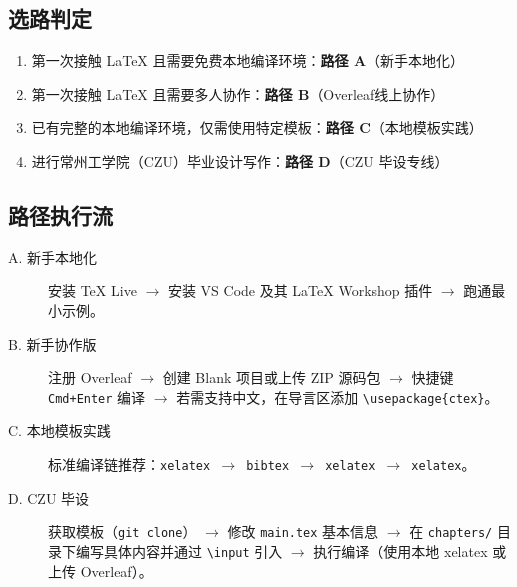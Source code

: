 \subsection{选路判定}
\begin{enumerate}
    \item 第一次接触 LaTeX 且需要免费本地编译环境：\textbf{路径 A}（新手本地化）
    \item 第一次接触 LaTeX 且需要多人协作：\textbf{路径 B}（Overleaf线上协作）
    \item 已有完整的本地编译环境，仅需使用特定模板：\textbf{路径 C}（本地模板实践）
    \item 进行常州工学院（CZU）毕业设计写作：\textbf{路径 D}（CZU 毕设专线）
\end{enumerate}

\subsection{路径执行流}
\begin{description}
    \item[A. 新手本地化] 安装 TeX Live $\rightarrow$ 安装 VS Code 及其 LaTeX Workshop 插件 $\rightarrow$ 跑通最小示例。
    \item[B. 新手协作版] 注册 Overleaf $\rightarrow$ 创建 Blank 项目或上传 ZIP 源码包 $\rightarrow$ 快捷键 \texttt{Cmd+Enter} 编译 $\rightarrow$ 若需支持中文，在导言区添加 \texttt{\textbackslash usepackage\{ctex\}}。
    \item[C. 本地模板实践] 标准编译链推荐：\texttt{xelatex $\rightarrow$ bibtex $\rightarrow$ xelatex $\rightarrow$ xelatex}。
    \item[D. CZU 毕设] 获取模板（\texttt{git clone}） $\rightarrow$ 修改 \texttt{main.tex} 基本信息 $\rightarrow$ 在 \texttt{chapters/} 目录下编写具体内容并通过 \texttt{\textbackslash input} 引入 $\rightarrow$ 执行编译（使用本地 xelatex 或上传 Overleaf）。
\end{description}
